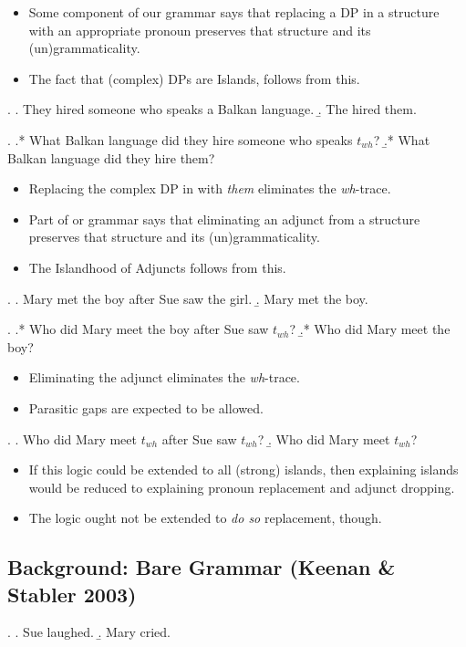 \documentclass[letterpaper]{article}
\begin{document}
\begin{itemize}
  \item Some component of our grammar says that replacing a DP in a structure with an appropriate pronoun preserves that structure and its (un)grammaticality.
  \item The fact that (complex) DPs are Islands, follows from this.
\end{itemize}
\ex. 
\a. They hired someone who speaks a Balkan language.
\b. The hired them.

\ex.
\a.* What Balkan language did they hire someone who speaks $t_{wh}$?
\b.* What Balkan language did they hire them?

\begin{itemize}
  \item Replacing the complex DP in \Last[a] with \textit{them} eliminates the \textit{wh}-trace.
  \item Part of or grammar says that eliminating an adjunct from a structure preserves that structure and its (un)grammaticality.
  \item The Islandhood of Adjuncts follows from this.
\end{itemize}
\ex.
\a. Mary met the boy after Sue saw the girl.
\b. Mary met the boy.

\ex.
\a.* Who did Mary meet the boy after Sue saw $t_{wh}$?
\b.* Who did Mary meet the boy?

\begin{itemize}
  \item Eliminating the adjunct eliminates the \textit{wh}-trace.
  \item Parasitic gaps are expected to be allowed. 
\end{itemize}
\ex.
\a. Who did Mary meet $t_{wh}$ after Sue saw $t_{wh}$?
\b. Who did Mary meet $t_{wh}$?

\begin{itemize}
  \item If this logic could be extended to all (strong) islands, then explaining islands would be reduced to explaining pronoun replacement and adjunct dropping.
  \item The logic ought not be extended to \textit{do so} replacement, though.
\end{itemize}
\subsection{Background: Bare Grammar (Keenan \& Stabler 2003)}
\ex.
\a. Sue laughed.
\b. Mary cried.
\end{document}
